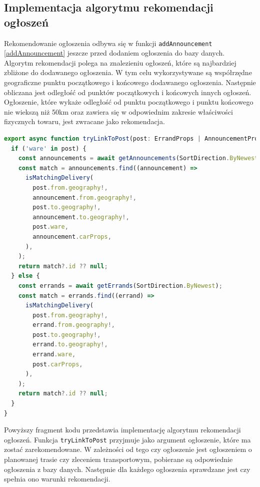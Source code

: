\pagebreak
\subsection{Implementacja algorytmu rekomendacji ogłoszeń}

Rekomendowanie ogłoszenia odbywa się w funkcji \texttt{addAnnouncement} \ref{addAnnouncement} jeszcze przed dodaniem ogłoszenia do bazy danych. Algorytm rekomendacji polega na znalezieniu ogłoszeń, które są najbardziej zbliżone do dodawanego ogłoszenia. W tym celu wykorzystywane są współrzędne geograficzne punktu początkowego i końcowego dodawanego ogłoszenia. Następnie obliczana jest odległość od punktów początkowych i końcowych innych ogłoszeń. Ogłoszenie, które wykaże odległość od punktu początkowego i punktu końcowego nie wiekszą niż 50km oraz zawiera się w odpowiednim zakresie właściwości fizycznych towaru, jest zwracane jako rekomendacja.

{\belowcaptionskip=-9pt
\begin{lstlisting}[language=JavaScript,caption=Implementacja rekomendacji ogłoszeń, label=lst:recomendPost]
  export async function tryLinkToPost(post: ErrandProps | AnnouncementProps): Promise<string | null> {
  if ('ware' in post) {
    const announcements = await getAnnouncements(SortDirection.ByNewest);
    const match = announcements.find((announcement) =>
      isMatchingDelivery(
        post.from.geography!,
        announcement.from.geography!,
        post.to.geography!,
        announcement.to.geography!,
        post.ware,
        announcement.carProps,
      ),
    );
    return match?.id ?? null;
  } else {
    const errands = await getErrands(SortDirection.ByNewest);
    const match = errands.find((errand) =>
      isMatchingDelivery(
        post.from.geography!,
        errand.from.geography!,
        post.to.geography!,
        errand.to.geography!,
        errand.ware,
        post.carProps,
      ),
    );
    return match?.id ?? null;
  }
}
\end{lstlisting}
}

Powyższy fragment kodu przedstawia implementację algorytmu rekomendacji ogłoszeń. Funkcja \texttt{tryLinkToPost} przyjmuje jako argument ogłoszenie, które ma zostać zarekomendowane. W zależności od tego czy ogłoszenie jest ogłoszeniem o planowanej trasie czy zleceniem transportowym, pobierane są odpowiednie ogłoszenia z bazy danych. Następnie dla każdego ogłoszenia sprawdzane jest czy spełnia ono warunki rekomendacji.

